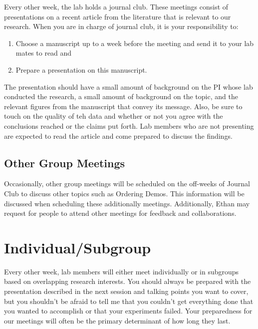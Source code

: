 \documentclass[
]{book}
\begin{document}
Every other week, the lab holds a journal club. These meetings consist of presentations on a recent article from the literature that is relevant to our research. When you are in charge of journal club, it is your responsibility to:

\begin{enumerate}
\def\labelenumi{\arabic{enumi}.}
\item
  Choose a manuscript up to a week before the meeting and send it to your lab mates to read and
\item
  Prepare a presentation on this manuscript.
\end{enumerate}

The presentation should have a small amount of background on the PI whose lab conducted the research, a small amount of background on the topic, and the relevant figures from the manuscript that convey its message. Also, be sure to touch on the quality of teh data and whether or not you agree with the conclusions reached or the claims put forth. Lab members who are not presenting are expected to read the article and come prepared to discuss the findings.

\hypertarget{other-group-meetings}{%
\subsection{Other Group Meetings}\label{other-group-meetings}}

Occasionally, other group meetings will be scheduled on the off-weeks of Journal Club to discuss other topics such as Ordering Demos. This information will be discussed when scheduling these additionally meetings. Additionally, Ethan may request for people to attend other meetings for feedback and collaborations.

\hypertarget{individualsubgroup}{%
\section{Individual/Subgroup}\label{individualsubgroup}}

Every other week, lab members will either meet individually or in subgroups based on overlapping research interests. You should always be prepared with the presentation described in the next session and talking points you want to cover, but you shouldn't be afraid to tell me that you couldn't get everything done that you wanted to accomplish or that your experiments failed. Your preparedness for our meetings will often be the primary determinant of how long they last.
\end{document}
